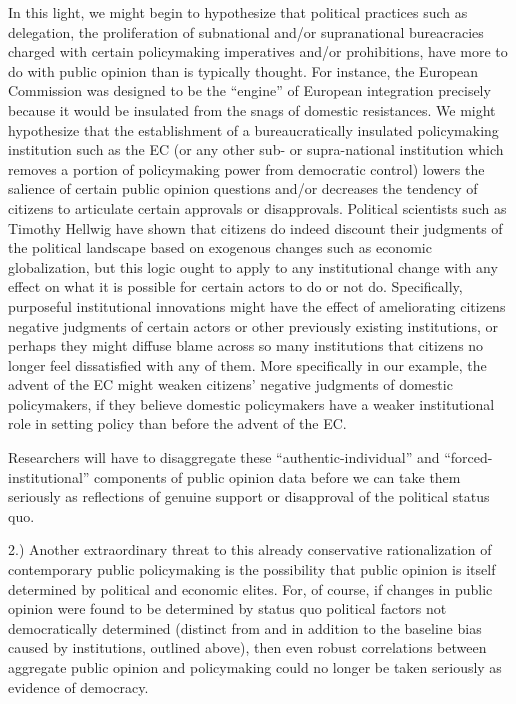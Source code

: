 \documentclass[12pt,book]{article}
\begin{document}
In this light, we might begin to hypothesize that political practices
such as delegation, the proliferation of subnational and/or
supranational bureacracies charged with certain policymaking imperatives
and/or prohibitions, have more to do with public opinion than is
typically thought. For instance, the European Commission was designed to
be the ``engine'' of European integration precisely because it would be
insulated from the snags of domestic resistances. We might hypothesize
that the establishment of a bureaucratically insulated policymaking
institution such as the EC (or any other sub- or supra-national
institution which removes a portion of policymaking power from
democratic control) lowers the salience of certain public opinion
questions and/or decreases the tendency of citizens to articulate
certain approvals or disapprovals. Political scientists such as Timothy
Hellwig have shown that citizens do indeed discount their judgments of
the political landscape based on exogenous changes such as economic
globalization, but this logic ought to apply to any institutional change
with any effect on what it is possible for certain actors to do or not
do. Specifically, purposeful institutional innovations might have the
effect of ameliorating citizens negative judgments of certain actors or
other previously existing institutions, or perhaps they might diffuse
blame across so many institutions that citizens no longer feel
dissatisfied with any of them. More specifically in our example, the
advent of the EC might weaken citizens' negative judgments of domestic
policymakers, if they believe domestic policymakers have a weaker
institutional role in setting policy than before the advent of the EC.

Researchers will have to disaggregate these ``authentic-individual'' and
``forced-institutional'' components of public opinion data before we can
take them seriously as reflections of genuine support or disapproval of
the political status quo.

2.) Another extraordinary threat to this already conservative
rationalization of contemporary public policymaking is the possibility
that public opinion is itself determined by political and economic
elites. For, of course, if changes in public opinion were found to be
determined by status quo political factors not democratically determined
(distinct from and in addition to the baseline bias caused by
institutions, outlined above), then even robust correlations between
aggregate public opinion and policymaking could no longer be taken
seriously as evidence of democracy.
\end{document}
